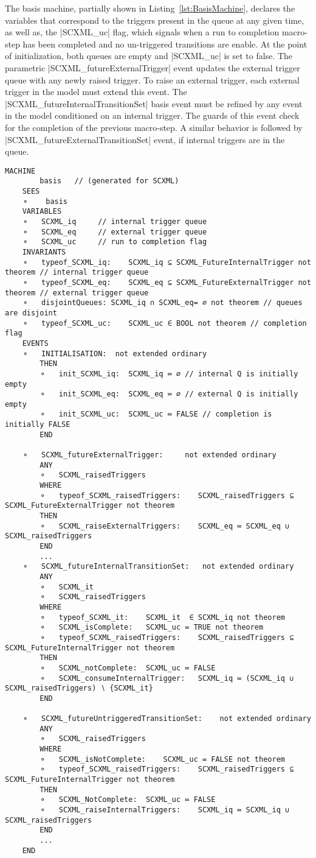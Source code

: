 The basis machine, partially shown in Listing~\ref{lst:BasisMachine}, declares the variables that correspond to the triggers 
present in the queue at any given time, as well as, the |SCXML_uc| flag, which signals when a run to completion macro-step 
has been completed and no un-triggered transitions are enable. At the point of initialization, both queues are empty and
|SCXML_uc| is set to false. The parametric |SCXML_futureExternalTrigger| event updates the external trigger queue with any 
newly raised trigger. To raise an external trigger, each external trigger in the model must extend this event. 
The |SCXML_futureInternalTransitionSet| basis event must be refined by any event in the model conditioned on an internal trigger. 
The guards of this event check for the completion of the previous macro-step. 
A similar behavior is followed by |SCXML_futureExternalTransitionSet| event, if internal triggers are in the queue.  


\begin{lstlisting}[caption={Snippet of abstract basis machine}, label={lst:BasisMachine},language=Event-B, escapechar=|, frame=single]
MACHINE
		basis 	// (generated for SCXML)
	SEES
	⚬	 basis 
	VARIABLES
	⚬	SCXML_iq	 // internal trigger queue
	⚬	SCXML_eq	 // external trigger queue
	⚬	SCXML_uc	 // run to completion flag
	INVARIANTS
	⚬	typeof_SCXML_iq:	SCXML_iq ⊆ SCXML_FutureInternalTrigger not theorem // internal trigger queue
	⚬	typeof_SCXML_eq:	SCXML_eq ⊆ SCXML_FutureExternalTrigger not theorem // external trigger queue
	⚬	disjointQueues:	SCXML_iq ∩ SCXML_eq= ∅ not theorem // queues are disjoint
	⚬	typeof_SCXML_uc:	SCXML_uc ∈ BOOL not theorem // completion flag
	EVENTS
	⚬	INITIALISATION:	 not extended ordinary 
		THEN
		⚬	init_SCXML_iq:	SCXML_iq ≔ ∅ // internal Q is initially empty
		⚬	init_SCXML_eq:	SCXML_eq ≔ ∅ // external Q is initially empty
		⚬	init_SCXML_uc:	SCXML_uc ≔ FALSE // completion is initially FALSE
		END

	⚬	SCXML_futureExternalTrigger:	 not extended ordinary 
		ANY
		⚬	SCXML_raisedTriggers	 
		WHERE
		⚬	typeof_SCXML_raisedTriggers:	SCXML_raisedTriggers ⊆ SCXML_FutureExternalTrigger not theorem 
		THEN
		⚬	SCXML_raiseExternalTriggers:	SCXML_eq ≔ SCXML_eq ∪ SCXML_raisedTriggers 
		END
        ...
	⚬	SCXML_futureInternalTransitionSet:	 not extended ordinary 
		ANY
		⚬	SCXML_it	 
		⚬	SCXML_raisedTriggers	 
		WHERE
		⚬	typeof_SCXML_it:	SCXML_it  ∈ SCXML_iq not theorem 
		⚬	SCXML_isComplete:	SCXML_uc = TRUE not theorem 
		⚬	typeof_SCXML_raisedTriggers:	SCXML_raisedTriggers ⊆ SCXML_FutureInternalTrigger not theorem 
		THEN
		⚬	SCXML_notComplete:	SCXML_uc ≔ FALSE 
		⚬	SCXML_consumeInternalTrigger:	SCXML_iq ≔ (SCXML_iq ∪ SCXML_raisedTriggers) ∖ {SCXML_it} 
		END

	⚬	SCXML_futureUntriggeredTransitionSet:	 not extended ordinary 
		ANY
		⚬	SCXML_raisedTriggers	 
		WHERE
		⚬	SCXML_isNotComplete:	SCXML_uc = FALSE not theorem 
		⚬	typeof_SCXML_raisedTriggers:	SCXML_raisedTriggers ⊆ SCXML_FutureInternalTrigger not theorem 
		THEN
		⚬	SCXML_NotComplete:	SCXML_uc ≔ FALSE 
		⚬	SCXML_raiseInternalTriggers:	SCXML_iq ≔ SCXML_iq ∪ SCXML_raisedTriggers 
		END
        ...
	END
\end{lstlisting}

